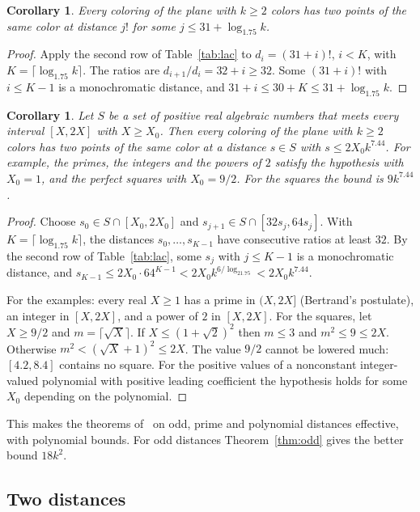 \documentclass[11pt]{amsart}
\newtheorem{corollary}[theorem]{Corollary}
\theoremstyle{definition}
\begin{document}
\begin{corollary}\label{cor:kahle}
Every coloring of the plane with $k\ge2$ colors has two points of the same color at distance $j!$ for some $j\le 31+\log_{1.75}k$.
\end{corollary}

\begin{proof}
Apply the second row of Table~\ref{tab:lac} to $d_i=(31+i)!$, $i<K$, with $K=\lceil\log_{1.75}k\rceil$. The ratios are $d_{i+1}/d_i=32+i\ge32$. Some $(31+i)!$ with $i\le K-1$ is a monochromatic distance, and $31+i\le30+K\le31+\log_{1.75}k$.
\end{proof}

\begin{corollary}\label{cor:dense}
Let $S$ be a set of positive real algebraic numbers that meets every interval $[X,2X]$ with $X\ge X_0$. Then every coloring of the plane with $k\ge2$ colors has two points of the same color at a distance $s\in S$ with $s\le2X_0k^{7.44}$. For example, the primes, the integers and the powers of $2$ satisfy the hypothesis with $X_0=1$, and the perfect squares with $X_0=9/2$. For the squares the bound is $9k^{7.44}$.
\end{corollary}

\begin{proof}
Choose $s_0\in S\cap[X_0,2X_0]$ and $s_{j+1}\in S\cap[32s_j,64s_j]$. With $K=\lceil\log_{1.75}k\rceil$, the distances $s_0,\dots,s_{K-1}$ have consecutive ratios at least $32$. By the second row of Table~\ref{tab:lac}, some $s_j$ with $j\le K-1$ is a monochromatic distance, and $s_{K-1}\le2X_0\cdot64^{K-1}<2X_0k^{6/\log_21.75}<2X_0k^{7.44}$.

For the examples: every real $X\ge1$ has a prime in $(X,2X]$ (Bertrand's postulate), an integer in $[X,2X]$, and a power of $2$ in $[X,2X]$. For the squares, let $X\ge9/2$ and $m=\lceil\sqrt X\rceil$. If $X\le(1+\sqrt2)^2$ then $m\le3$ and $m^2\le9\le2X$. Otherwise $m^2<(\sqrt X+1)^2\le2X$. The value $9/2$ cannot be lowered much: $[4.2,8.4]$ contains no square. For the positive values of a nonconstant integer-valued polynomial with positive leading coefficient the hypothesis holds for some $X_0$ depending on the polynomial.
\end{proof}

This makes the theorems of~\cite{DaviesOdd,DMP} on odd, prime and polynomial distances effective, with polynomial bounds. For odd distances Theorem~\ref{thm:odd} gives the better bound $18k^2$.

\subsection{Two distances}
\end{document}
